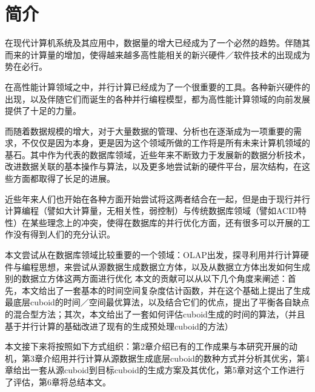 \chapter{简介}
在现代计算机系统及其应用中，数据量的增大已经成为了一个必然的趋势。伴随其而来的计算量的增加，使得越来越多高性能相关的新兴硬件／软件技术的出现成为势在必行。

在高性能计算领域之中，并行计算已经成为了一个很重要的工具。各种新兴硬件的出现，以及伴随它们而诞生的各种并行编程模型，都为高性能计算领域的向前发展提供了十足的力量。

而随着数据规模的增大，对于大量数据的管理、分析也在逐渐成为一项重要的需求，不仅仅是因为本身，更是因为这个领域所做的工作将是所有未来计算机领域的基石。其中作为代表的数据库领域，近些年来不断致力于发展新的数据分析技术，改进数据关联的基本操作与算法，以及更多地尝试新的硬件平台，层次结构，在这些方面都取得了长足的进展。

近些年来人们也开始在各种方面开始尝试将这两者结合在一起，但是由于现行并行计算编程（譬如大计算量，无相关性，弱控制）与传统数据库领域（譬如ACID特性）在某些理念上的冲突，使得在数据库的并行优化方面，还有很多可以开展的工作没有得到人们的充分认识。

本文尝试从在数据库领域比较重要的一个领域：OLAP出发，探寻利用并行计算硬件与编程思想，来尝试从源数据生成数据立方体，以及从数据立方体出发如何生成别的数据立方体这两方面进行优化
本文的贡献可以从以下几个角度来阐述：首先，本文给出了一套基本的时间空间复杂度估计函数，并在这个基础上提出了生成最底层cuboid的时间／空间最优算法，以及结合它们的优点，提出了平衡各自缺点的混合型方法；其次，本文给出了一套如何评估cuboid生成的时间的算法，（并且基于并行计算的基础改进了现有的生成预处理cuboid的方法）

本文接下来将按照如下方式组织：第2章介绍已有的工作成果与本研究开展的动机，第3章介绍用并行计算从源数据生成底层cuboid的数种方式并分析其优劣，第4章给出一套从源cuboid到目标cuboid的生成方案及其优化，第5章对这个工作进行了评估，第6章将总结本文。
